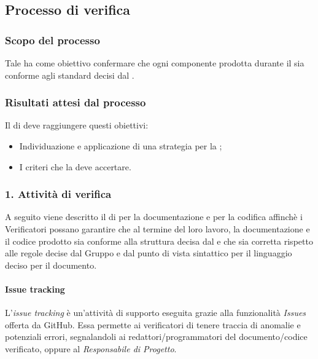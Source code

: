 \subsection{Processo di verifica}
\subsubsection{Scopo del processo}
Tale  ha come obiettivo confermare che ogni componente prodotta durante il  sia conforme agli standard decisi dal .
\subsubsection{Risultati attesi dal processo}
Il  di  deve raggiungere questi obiettivi:
\begin{itemize}
\item Individuazione e applicazione di una strategia per la ;
\item I criteri che la  deve accertare.
\end{itemize}

\subsubsection{1. Attivit\`a di verifica}
A seguito viene descritto il  di  per la documentazione e per la codifica affinchè i Verificatori possano garantire che al termine del loro lavoro, la documentazione e il codice prodotto sia conforme alla struttura decisa dal  e che sia corretta rispetto alle regole decise dal Gruppo e dal punto di vista sintattico per il linguaggio deciso per il documento.

\paragraph*{Issue tracking}
L'\textit{issue tracking} è un'attività di supporto eseguita grazie alla funzionalità \textit{Issues} offerta da GitHub.
Essa permette ai verificatori di tenere traccia di anomalie e potenziali errori, segnalandoli ai 
redattori/programmatori del documento/codice verificato, oppure al \textit{Responsabile di Progetto}.

